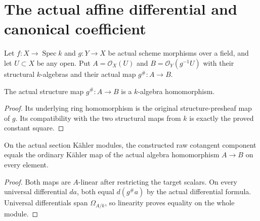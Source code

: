 \section{The actual affine differential and canonical coefficient}

Let $f:X\to\operatorname{Spec}k$ and $g:Y\to X$ be actual scheme morphisms over a field, and let $U\subset X$ be any open. Put $A=\mathcal O_X(U)$ and $B=\mathcal O_Y(g^{-1}U)$ with their structural $k$-algebras and their actual map $g^\#:A\to B$.

\begin{definition}\label{sc0-canonical-morphism-sections:algebra}
\leanok
{}
The actual structure map $g^\#:A\to B$ is a $k$-algebra homomorphism.
\end{definition}
\begin{proof}
Its underlying ring homomorphism is the original structure-presheaf map of $g$. Its compatibility with the two structural maps from $k$ is exactly the proved constant square.
\end{proof}

\begin{lemma}\label{sc0-canonical-morphism-sections:kaehler}
\leanok
{}
On the actual section Kähler modules, the constructed raw cotangent component equals the ordinary Kähler map of the actual algebra homomorphism $A\to B$ on every element.
\end{lemma}
\begin{proof}
Both maps are $A$-linear after restricting the target scalars. On every universal differential $da$, both equal $d(g^\#a)$ by the actual differential formula. Universal differentials span $\Omega_{A/k}$, so linearity proves equality on the whole module.
\end{proof}

